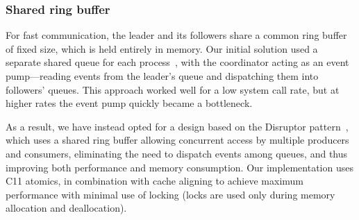 

\subsubsection{Shared ring buffer}
\label{sec:ring}

For fast communication, the leader and its followers share a common
ring buffer of fixed size, which is held entirely in memory.  Our
initial solution used a separate shared queue for each
process~\cite{fastforward,mcringbuffer}, with the
coordinator acting as an event pump---reading events from the leader's
queue and dispatching them into followers' queues.  This approach
worked well for a low system call rate, but at higher rates the event
pump quickly became a bottleneck.  

As a result, we have instead opted for a design based on the Disruptor
pattern~\cite{disruptor}, which uses a shared ring buffer allowing concurrent
access by multiple producers and consumers, eliminating the need to dispatch
events among queues, and thus improving both performance and memory
consumption.  Our implementation uses C11 atomics, 
in combination with cache aligning to
achieve maximum performance with minimal use of locking (locks are used only
during memory allocation and deallocation).

